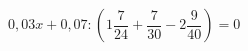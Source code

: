 \begin{ex}[type=equation]
	\begin{condition}
		$0,03x + 0,07: \left(1\dfrac{7}{24} + \dfrac{7}{30} - 2\dfrac{9}{40}\right) = 0$
	\end{condition}
\end{ex}